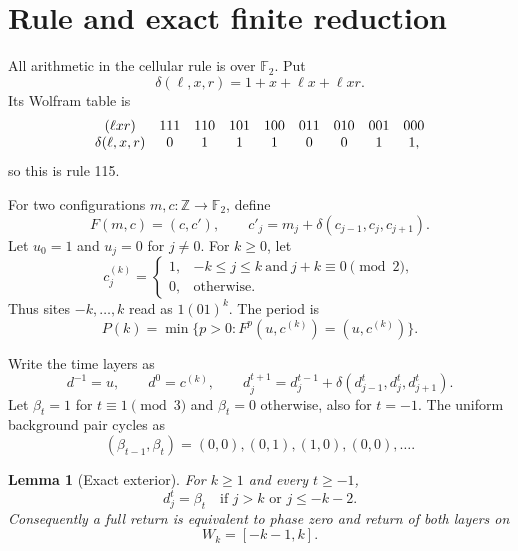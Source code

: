 \documentclass[11pt]{amsart}
\newtheorem{lemma}[theorem]{Lemma}
\theoremstyle{definition}
\begin{document}
\section{Rule and exact finite reduction}

All arithmetic in the cellular rule is over \(\mathbb F_2\).  Put
\[
\delta(\ell,x,r)=1+x+\ell x+\ell xr.
\]
Its Wolfram table is
\[
\begin{array}{c@{\quad}cccccccc}
(\ell x r)&111&110&101&100&011&010&001&000\\
\delta(\ell,x,r)&0&1&1&1&0&0&1&1,
\end{array}
\]
so this is rule 115.

For two configurations \(m,c\colon\mathbb Z\to\mathbb F_2\), define
\[
F(m,c)=(c,c'),\qquad
c'_j=m_j+\delta(c_{j-1},c_j,c_{j+1}).                 \tag{2.1}
\]
Let \(u_0=1\) and \(u_j=0\) for \(j\neq0\).  For \(k\geq0\), let
\[
c^{(k)}_j=
\begin{cases}
1,&-k\leq j\leq k\ \text{and}\ j+k\equiv0\pmod2,\\
0,&\text{otherwise}.
\end{cases}
\]
Thus sites \(-k,\ldots,k\) read as \(1{(01)}^k\).  The period is
\[
P(k)=\min\{p>0:F^p(u,c^{(k)})=(u,c^{(k)})\}.          \tag{2.2}
\]

Write the time layers as
\[
d^{-1}=u,\qquad d^0=c^{(k)},\qquad
d^{t+1}_j=d^{t-1}_j+
 \delta(d^t_{j-1},d^t_j,d^t_{j+1}).                  \tag{2.3}
\]
Let \(\beta_t=1\) for \(t\equiv1\pmod3\) and \(\beta_t=0\) otherwise,
also for \(t=-1\).  The uniform background pair cycles as
\[
(\beta_{t-1},\beta_t)=(0,0),(0,1),(1,0),(0,0),\ldots. \tag{2.4}
\]

\begin{lemma}[Exact exterior]\label{lem:exterior}
For \(k\geq1\) and every \(t\geq-1\),
\[
d^t_j=\beta_t\quad\text{if }j>k\text{ or }j\leq-k-2. \tag{2.5}
\]
Consequently a full return is equivalent to phase zero and return of both
layers on
\[
W_k=[-k-1,k].                                         \tag{2.6}
\]
\end{lemma}
\end{document}
